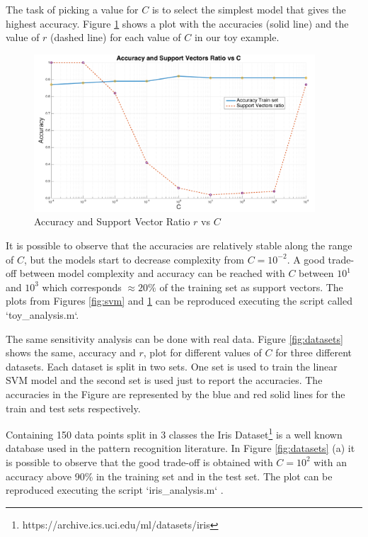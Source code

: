 The task of picking a value for $C$ is to select the simplest model that gives the highest accuracy.
Figure \ref{fig:toy} shows a plot with the accuracies (solid line) and the value of $r$ (dashed line) for each value of $C$ in our toy example.

\begin{figure}[!htb]
\begin{center}
\includegraphics [width=10.5cm] {./graphics/toy_plot.png}
\caption{Accuracy and Support Vector Ratio $r$ vs $C$} \label{fig:toy}
\end{center}
\end{figure}

It is possible to observe that the accuracies are relatively stable along the range of $C$, but the models start to decrease complexity from $C=10^{-2}$.
A good trade-off between model complexity and accuracy can be reached with $C$ between $10^1$ and $10^3$ which corresponds $\approx 20\%$ of the training set as support vectors. 
The plots from Figures \ref{fig:svm} and \ref{fig:toy} can be reproduced executing the script called `toy\_analysis.m`.

The same sensitivity analysis can be done with real data.
Figure \ref{fig:datasets} shows the same, accuracy and $r$, plot for different values of $C$ for three different datasets.
Each dataset is split in two sets.
One set is used to train the linear SVM model and the second set is used just to report the accuracies.
The accuracies in the Figure are represented by the blue and red solid lines for the train and test sets respectively.

Containing 150 data points split in 3 classes the Iris Dataset\footnote{https://archive.ics.uci.edu/ml/datasets/iris} is a well known database used in the pattern recognition literature.
In Figure \ref{fig:datasets} (a) it is possible to observe that the good trade-off is obtained with $C=10^2$ with an accuracy above 90\% in the training set and in the test set.
The plot can be reproduced executing the script `iris\_analysis.m` .

